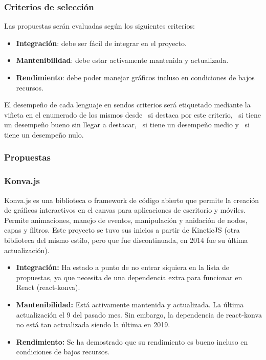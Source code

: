 \subsubsection{Criterios de selección}

Las propuestas serán evaluadas según los siguientes criterios:

\begin{itemize}
  \item \textbf{Integración}: debe ser fácil de integrar en el proyecto.
  \item \textbf{Mantenibilidad}: debe estar activamente mantenida y actualizada.
  \item \textbf{Rendimiento}: debe poder manejar gráficos incluso en condiciones de bajos recursos.
\end{itemize}

El desempeño de cada lenguaje en sendos criterios será etiquetado mediante la viñeta en el enumerado de los mismos desde \esp~si destaca por este criterio, \bien~si tiene un desempeño bueno sin llegar a destacar, \regular~si tiene un desempeño medio y \mal~si tiene un desempeño nulo.

\subsubsection{Propuestas}

\subsubsection{Konva.js}

Konva.js es una biblioteca o framework de código abierto que permite la creación de gráficos interactivos en el canvas para aplicaciones de escritorio y móviles. Permite animaciones, manejo de eventos, manipulación y anidación de nodos, capas y filtros. Este proyecto se tuvo sus inicios a partir de KineticJS (otra biblioteca del mismo estilo, pero que fue discontinuada, en 2014 fue su última actualización).

\begin{itemize}
    \item[\regular] \textbf{Integración:} Ha estado a punto de no entrar siquiera en la lista de propuestas, ya que necesita de una dependencia extra para funcionar en React (react-konva).
    \item[\bien] \textbf{Mantenibilidad:} Está activamente mantenida y actualizada. La última actualización el 9 del pasado mes. Sin embargo, la dependencia de react-konva no está tan actualizada siendo la última en 2019.
    \item[\bien] \textbf{Rendimiento:} Se ha demostrado que su rendimiento es bueno incluso en condiciones de bajos recursos.
\end{itemize}

